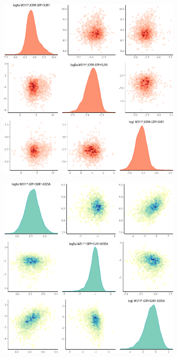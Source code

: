 \begin{figure}[h]
\begin{subfigure}[t]{0.3\textwidth}
	\end{subfigure}
	\vfill
	\begin{subfigure}[t]{0.3\textwidth}
		\caption{}\label{apxfig:inhib_cc_7}
		\centering
		\includegraphics[width=\textwidth]{inhibition_crosscorr_7.pdf}
	\end{subfigure}
	\hfill
	\begin{subfigure}[t]{0.3\textwidth}
		\caption{}\label{apxfig:inhib_cc_8}
		\centering
		\includegraphics[width=\textwidth]{inhibition_crosscorr_8.pdf}

\end{subfigure}
\end{figure}
